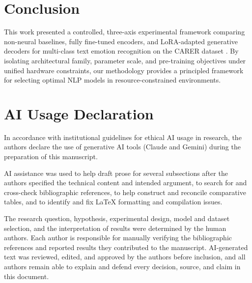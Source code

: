 \documentclass[conference]{IEEEtran}
\begin{document}
\section{Conclusion}
\label{sec:conclusion}

This work presented a controlled, three-axis experimental framework comparing non-neural baselines, fully fine-tuned encoders, 
and LoRA-adapted generative decoders for multi-class text emotion recognition on the CARER dataset \cite{saravia2018carer}. 
By isolating architectural family, parameter scale, and pre-training objectives under unified hardware constraints, our methodology 
provides a principled framework for selecting optimal NLP models in resource-constrained environments.

\section*{AI Usage Declaration}
In accordance with institutional guidelines for ethical AI usage in research, the authors declare the use of generative AI tools 
(Claude and Gemini) during the preparation of this manuscript.

AI assistance was used to help draft prose for several subsections after the authors specified the technical content and intended 
argument, to search for and cross-check bibliographic references, to help construct and reconcile comparative tables, and to identify 
and fix LaTeX formatting and compilation issues.

The research question, hypothesis, experimental design, model and dataset selection, and the interpretation of results were determined 
by the human authors. Each author is responsible for manually verifying the bibliographic references and reported results they 
contributed to the manuscript. AI-generated text was reviewed, edited, and approved by the authors before inclusion, and all authors 
remain able to explain and defend every decision, source, and claim in this document.


\end{document}
